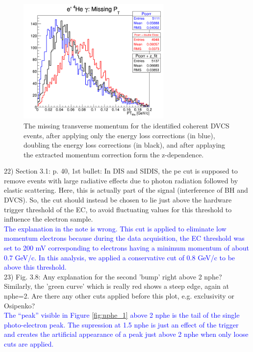 \begin{figure}[tbp]
   \centering
   \includegraphics[height=6.2cm]{fig/Coh_e4Hegamma_PT_Mis.png}
   \caption{The missing transverse momentum for the identified coherent DVCS 
      events, after applying only the energy loss corrections (in blue), 
      doubling the energy loss corrections (in black), and after applaying the 
   extracted momentum correction form the z-dependence.}
   \label{fig:dvcs_mom_corr}
\end{figure}

22) Section 3.1: p. 40, 1st bullet: In DIS and SIDIS, the pe cut is supposed to 
remove events with large radiative effects due to photon radiation followed by 
elastic scattering. Here, this is actually part of the signal (interference of 
BH and DVCS). So, the cut should instead be chosen to lie just above the 
hardware trigger threshold of the EC, to avoid fluctuating values for this 
threshold to influence the electron sample.\\
\textcolor{blue}{The explanation in the note is wrong. This cut is applied to 
   eliminate low momentum electrons because during the data acquisition, the EC 
   threshold was set to 200 mV corresponding to electrons having a minimum 
momentum of about 0.7 GeV/c. In this analysis, we applied a conservative cut of 
0.8 GeV/c to be above this threshold.}\\

23) Fig. 3.8: Any explanation for the second 'bump' right above 2 nphe? 
Similarly, the 'green curve' which is really red shows a steep edge, again at 
nphe=2. Are there any other cuts applied before this plot, e.g. exclusivity or 
Osipenko?\\
  \textcolor{blue}{The ``peak'' visible in Figure \ref{fig:nphe_1} above 2 
nphe is the tail of the single photo-electron peak. 
The supression at 1.5 nphe is just an effect of the trigger and creates the 
artificial appearance of a peak just above 2 nphe when only loose cuts are 
applied.}\\

